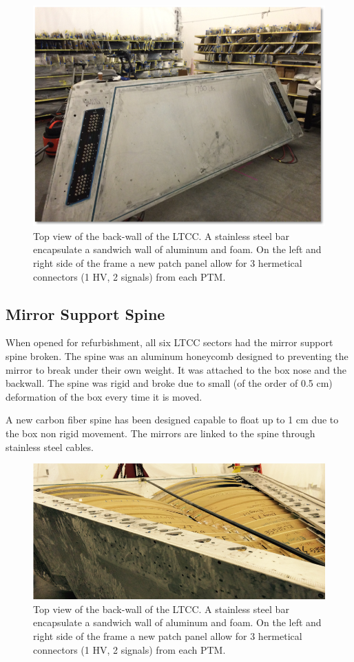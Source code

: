 \begin{figure}[h]
	\centering
	\includegraphics[width=0.95\columnwidth,keepaspectratio]{img/backWall.png}
	\caption{Top view of the back-wall of the LTCC. A stainless steel bar encapsulate a sandwich wall of aluminum and foam. On the left and right side
            of the frame a new patch panel allow for 3 hermetical connectors (1 HV, 2 signals) from each PTM. }
	\label{fig:backWall}
\end{figure}


\subsection{Mirror Support Spine}

When opened for refurbishment, all six LTCC sectors had the mirror support spine broken. The spine was an aluminum honeycomb designed to preventing
the mirror to break under their own weight. It was attached to the box nose and the backwall. The spine was rigid and broke due to small (of the order of 0.5 cm) deformation of the box every time it
is moved.

A new carbon fiber spine has been designed capable to float up to 1 cm due to the box non rigid movement. The mirrors are linked to the spine through stainless steel cables.


\begin{figure}[h]
	\centering
	\includegraphics[width=1.0\columnwidth,keepaspectratio]{img/spine.png}
	\caption{Top view of the back-wall of the LTCC. A stainless steel bar encapsulate a sandwich wall of aluminum and foam. On the left and right side
            of the frame a new patch panel allow for 3 hermetical connectors (1 HV, 2 signals) from each PTM. }
	\label{fig:spine}
\end{figure}

